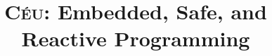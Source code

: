 \documentclass{sigplan-proc}
\newcommand{\2}{\;\;}
\newcommand{\5}{\;\;\;\;\;}
\newcommand{\CEU}{\textsc{C\'{e}u}}
\newcommand{\code}[1] {{\small{\texttt{#1}}}}
\begin{document}

\title{\CEU{}: Embedded, Safe, and Reactive Programming}

\end{document}
